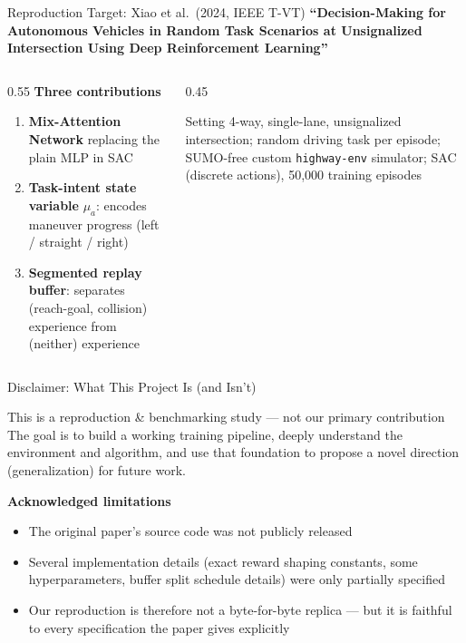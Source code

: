 \documentclass[aspectratio=169,10pt]{beamer}
\begin{document}
\begin{frame}{Reproduction Target: Xiao et al.\ (2024, IEEE T-VT)}
    \textbf{``Decision-Making for Autonomous Vehicles in Random Task Scenarios at Unsignalized Intersection Using Deep Reinforcement Learning''} \cite{xiao2024decision}
    \vspace{6pt}
    \begin{columns}[T]
        \begin{column}{0.55\textwidth}
            \textbf{Three contributions}
            \begin{enumerate}
                \item \textbf{Mix-Attention Network} replacing the plain MLP in SAC
                \item \textbf{Task-intent state variable} $\mu_a$: encodes maneuver progress (left / straight / right)
                \item \textbf{Segmented replay buffer}: separates (reach-goal, collision) experience from (neither) experience
            \end{enumerate}
        \end{column}
        \begin{column}{0.45\textwidth}
            \begin{block}{Setting}
                4-way, single-lane, unsignalized intersection; random driving task per episode; SUMO-free custom \texttt{highway-env} simulator; SAC (discrete actions), 50{,}000 training episodes
            \end{block}
        \end{column}
    \end{columns}
\end{frame}

\begin{frame}{Disclaimer: What This Project Is (and Isn't)}
    \begin{alertblock}{This is a reproduction \& benchmarking study --- not our primary contribution}
        The goal is to build a working training pipeline, deeply understand the environment and algorithm, and use that foundation to propose a novel direction (generalization) for future work.
    \end{alertblock}
    \vspace{6pt}
    \textbf{Acknowledged limitations}
    \begin{itemize}
        \item The original paper's source code was \alert{not publicly released}
        \item Several implementation details (exact reward shaping constants, some hyperparameters, buffer split schedule details) were only partially specified
        \item Our reproduction is therefore \alert{not a byte-for-byte replica} --- but it is faithful to every specification the paper gives explicitly
    \end{itemize}
\end{frame}
\end{document}

